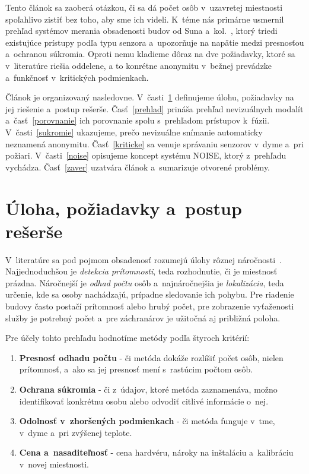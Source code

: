\documentclass[10pt,twoside,a4paper]{article}
\begin{document}
Tento článok sa zaoberá otázkou, či sa dá počet osôb v~uzavretej miestnosti spoľahlivo zistiť bez toho, aby sme ich videli. K~téme nás primárne usmernil prehľad systémov merania obsadenosti budov od Suna a~kol.~\cite{sun2020review}, ktorý triedi existujúce prístupy podľa typu senzora a~upozorňuje na napätie medzi presnosťou a~ochranou súkromia. Oproti nemu kladieme dôraz na dve požiadavky, ktoré sa v~literatúre riešia oddelene, a to konrétne anonymitu v~bežnej prevádzke a~funkčnosť v~kritických podmienkach.

Článok je organizovaný nasledovne. V~časti~\ref{poziadavky} definujeme úlohu, požiadavky na jej riešenie a~postup rešerše. Časť~\ref{prehlad} prináša prehľad nevizuálnych modalít a~časť~\ref{porovnanie} ich porovnanie spolu s~prehľadom prístupov k~fúzii. V~časti~\ref{sukromie} ukazujeme, prečo nevizuálne snímanie automaticky neznamená anonymitu. Časť~\ref{kriticke} sa venuje správaniu senzorov v~dyme a~pri požiari. V~časti~\ref{noise} opisujeme koncept systému NOISE, ktorý z~prehľadu vychádza. Časť~\ref{zaver} uzatvára článok a~sumarizuje otvorené problémy.

\section{Úloha, požiadavky a~postup rešerše}\label{poziadavky}

V~literatúre sa pod pojmom obsadenosť rozumejú úlohy rôznej náročnosti~\cite{chen2018review,sun2020review}. Najjednoduchšou je \emph{detekcia prítomnosti}, teda rozhodnutie, či je miestnosť prázdna. Náročnejší je \emph{odhad počtu} osôb a~najnáročnejšia je \emph{lokalizácia}, teda určenie, kde sa osoby nachádzajú, prípadne sledovanie ich pohybu. Pre riadenie budovy často postačí prítomnosť alebo hrubý počet, pre zobrazenie vyťaženosti služby je potrebný počet a~pre záchranárov je užitočná aj približná poloha.

Pre účely tohto prehľadu hodnotíme metódy podľa štyroch kritérií:
\begin{enumerate}
\item \textbf{Presnosť odhadu počtu} - či metóda dokáže rozlíšiť počet osôb, nielen prítomnosť, a~ako sa jej presnosť mení s~rastúcim počtom osôb.
\item \textbf{Ochrana súkromia} - či z~údajov, ktoré metóda zaznamenáva, možno identifikovať konkrétnu osobu alebo odvodiť citlivé informácie o~nej.
\item \textbf{Odolnosť v~zhoršených podmienkach} - či metóda funguje v~tme, v~dyme a~pri zvýšenej teplote.
\item \textbf{Cena a~nasaditeľnosť} - cena hardvéru, nároky na inštaláciu a~kalibráciu v~novej miestnosti.
\end{enumerate}
\end{document}
